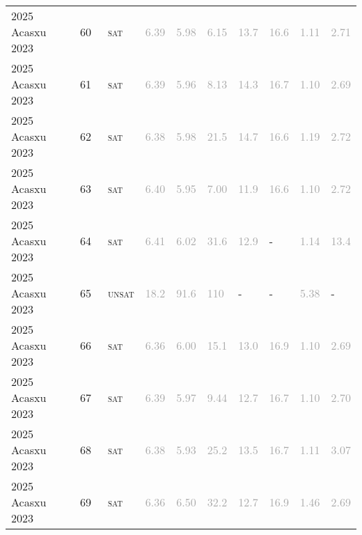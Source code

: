 \begin{center}
{\begin{longtable}{@{}llllllllll@{}}
2025 Acasxu 2023 & 60 & ~\textsc{sat} & \textcolor{darkgray}{6.39} & \textcolor{darkgray}{5.98} & \textcolor{darkgray}{6.15} & \textcolor{darkgray}{13.7} & \textcolor{darkgray}{16.6} & \textcolor{darkgray}{1.11} & \textcolor{darkgray}{2.71} \\
2025 Acasxu 2023 & 61 & ~\textsc{sat} & \textcolor{darkgray}{6.39} & \textcolor{darkgray}{5.96} & \textcolor{darkgray}{8.13} & \textcolor{darkgray}{14.3} & \textcolor{darkgray}{16.7} & \textcolor{darkgray}{1.10} & \textcolor{darkgray}{2.69} \\
2025 Acasxu 2023 & 62 & ~\textsc{sat} & \textcolor{darkgray}{6.38} & \textcolor{darkgray}{5.98} & \textcolor{darkgray}{21.5} & \textcolor{darkgray}{14.7} & \textcolor{darkgray}{16.6} & \textcolor{darkgray}{1.19} & \textcolor{darkgray}{2.72} \\
2025 Acasxu 2023 & 63 & ~\textsc{sat} & \textcolor{darkgray}{6.40} & \textcolor{darkgray}{5.95} & \textcolor{darkgray}{7.00} & \textcolor{darkgray}{11.9} & \textcolor{darkgray}{16.6} & \textcolor{darkgray}{1.10} & \textcolor{darkgray}{2.72} \\
2025 Acasxu 2023 & 64 & ~\textsc{sat} & \textcolor{darkgray}{6.41} & \textcolor{darkgray}{6.02} & \textcolor{darkgray}{31.6} & \textcolor{darkgray}{12.9} & - & \textcolor{darkgray}{1.14} & \textcolor{darkgray}{13.4} \\
2025 Acasxu 2023 & 65 & ~\textsc{unsat} & \textcolor{darkgray}{18.2} & \textcolor{darkgray}{91.6} & \textcolor{darkgray}{110} & - & - & \textcolor{darkgray}{5.38} & - \\
2025 Acasxu 2023 & 66 & ~\textsc{sat} & \textcolor{darkgray}{6.36} & \textcolor{darkgray}{6.00} & \textcolor{darkgray}{15.1} & \textcolor{darkgray}{13.0} & \textcolor{darkgray}{16.9} & \textcolor{darkgray}{1.10} & \textcolor{darkgray}{2.69} \\
2025 Acasxu 2023 & 67 & ~\textsc{sat} & \textcolor{darkgray}{6.39} & \textcolor{darkgray}{5.97} & \textcolor{darkgray}{9.44} & \textcolor{darkgray}{12.7} & \textcolor{darkgray}{16.7} & \textcolor{darkgray}{1.10} & \textcolor{darkgray}{2.70} \\
2025 Acasxu 2023 & 68 & ~\textsc{sat} & \textcolor{darkgray}{6.38} & \textcolor{darkgray}{5.93} & \textcolor{darkgray}{25.2} & \textcolor{darkgray}{13.5} & \textcolor{darkgray}{16.7} & \textcolor{darkgray}{1.11} & \textcolor{darkgray}{3.07} \\
2025 Acasxu 2023 & 69 & ~\textsc{sat} & \textcolor{darkgray}{6.36} & \textcolor{darkgray}{6.50} & \textcolor{darkgray}{32.2} & \textcolor{darkgray}{12.7} & \textcolor{darkgray}{16.9} & \textcolor{darkgray}{1.46} & \textcolor{darkgray}{2.69} \\

\end{longtable}}
\end{center}
